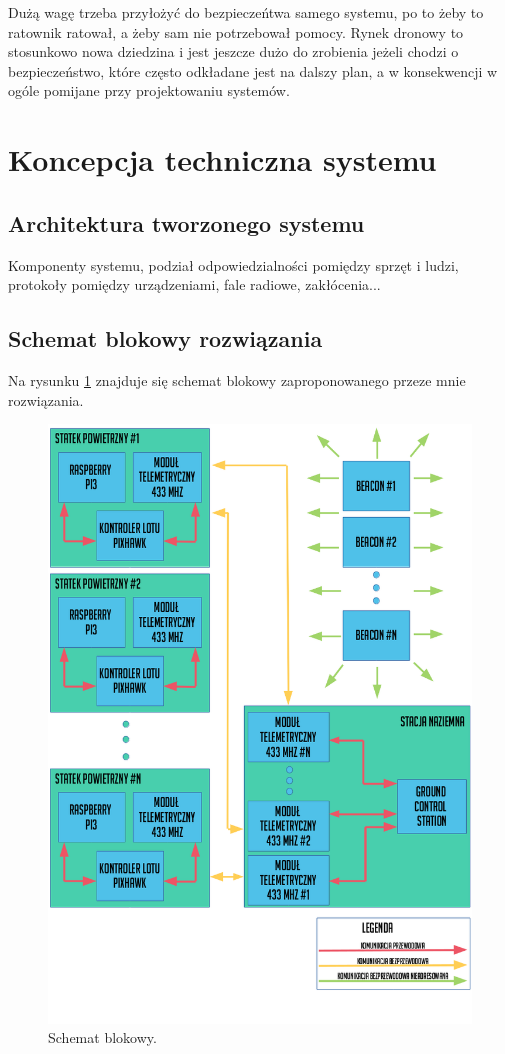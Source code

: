 Dużą wagę trzeba przyłożyć do bezpieczeńtwa samego systemu, po to żeby to ratownik ratował, a żeby sam nie potrzebował pomocy. Rynek dronowy to stosunkowo nowa dziedzina i jest jeszcze dużo do zrobienia jeżeli chodzi o bezpieczeństwo, które często odkładane jest na dalszy plan, a w konsekwencji w ogóle pomijane przy projektowaniu systemów. 

\section{Koncepcja techniczna systemu}
\subsection{Architektura tworzonego systemu}
Komponenty systemu, podział odpowiedzialności pomiędzy sprzęt i ludzi, protokoły pomiędzy urządzeniami, fale radiowe, zakłócenia...
\subsection{Schemat blokowy rozwiązania}
Na rysunku \ref{fig:schematblokowy} znajduje się schemat blokowy zaproponowanego przeze mnie rozwiązania.
\begin{figure}[!th]
    \centering
    \includegraphics[width=15cm]{zalaczniki/obrazy/schemat_ogolny.png}
    \caption{Schemat blokowy.}
    \label{fig:schematblokowy}
\end{figure}


